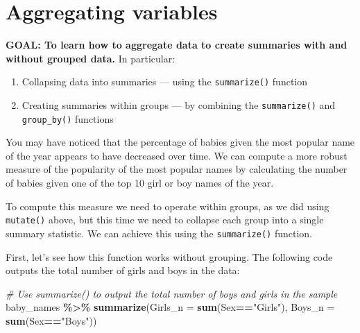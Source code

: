 \documentclass[
]{book}
\newenvironment{Shaded}{\begin{snugshade}}{\end{snugshade}}
\newcommand{\CommentTok}[1]{\textcolor[rgb]{0.56,0.35,0.01}{\textit{#1}}}
\newcommand{\DataTypeTok}[1]{\textcolor[rgb]{0.13,0.29,0.53}{#1}}
\newcommand{\KeywordTok}[1]{\textcolor[rgb]{0.13,0.29,0.53}{\textbf{#1}}}
\newcommand{\NormalTok}[1]{#1}
\newcommand{\OperatorTok}[1]{\textcolor[rgb]{0.81,0.36,0.00}{\textbf{#1}}}
\newcommand{\StringTok}[1]{\textcolor[rgb]{0.31,0.60,0.02}{#1}}
\providecommand{\tightlist}{%
  \setlength{\itemsep}{0pt}\setlength{\parskip}{0pt}}
\begin{document}
\hypertarget{aggregating-variables}{%
\section{Aggregating variables}\label{aggregating-variables}}

\begin{alert}

\textbf{GOAL: To learn how to aggregate data to create summaries with and without grouped data.} In particular:

\begin{enumerate}
\def\labelenumi{\arabic{enumi}.}
\tightlist
\item
  Collapsing data into summaries --- using the \texttt{summarize()} function
\item
  Creating summaries within groups --- by combining the \texttt{summarize()} and \texttt{group\_by()} functions
\end{enumerate}

\end{alert}

You may have noticed that the percentage of babies given the most popular name of the year appears to have decreased over time. We can compute a more robust measure of the popularity of the most popular names by calculating the number of babies given one of the top 10 girl or boy names of the year.

To compute this measure we need to operate within groups, as we did using \texttt{mutate()} above, but this time we need to collapse each group into a single summary statistic. We can achieve this using the \texttt{summarize()} function.

First, let's see how this function works without grouping. The following code outputs the total number of girls and boys in the data:

\begin{Shaded}
\begin{Highlighting}[]
\CommentTok{\# Use summarize() to output the total number of boys and girls in the sample}
\NormalTok{baby\_names }\OperatorTok{\%\textgreater{}\%}\StringTok{ }
\StringTok{  }\KeywordTok{summarize}\NormalTok{(}\DataTypeTok{Girls\_n =} \KeywordTok{sum}\NormalTok{(Sex}\OperatorTok{==}\StringTok{"Girls"}\NormalTok{),}
            \DataTypeTok{Boys\_n =} \KeywordTok{sum}\NormalTok{(Sex}\OperatorTok{==}\StringTok{"Boys"}\NormalTok{))}
\end{Highlighting}
\end{Shaded}
\end{document}
